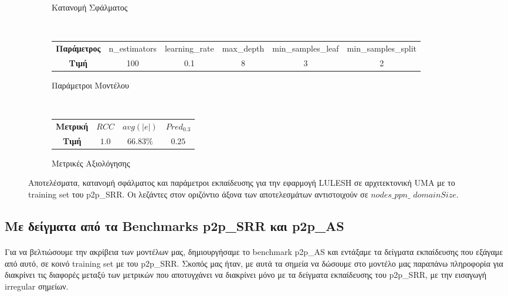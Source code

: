 \begin{figure}[H]
\begin{subfigure}[b]{0.47\textwidth}
        \caption{Κατανομή Σφάλματος}
        \label{fig:NB_lulesh_UMA_err}
    \end{subfigure}  
    \\[0.2cm]
    \begin{subfigure}[b]{\textwidth}
   	 	\scriptsize
		\begin{tabular}{c||c|c|c|c|c}
			\textbf{Παράμετρος} & n\_estimators & learning\_rate & max\_depth & min\_samples\_leaf & min\_samples\_split \\
			\textbf{Τιμή}       &       100        &  0.1               &  8          &  3                  &    2                 
		\end{tabular}
		\caption{Παράμετροι Μοντέλου}
    \end{subfigure}
    \\[0.2cm]
    \begin{subfigure}[b]{\textwidth}
    		\centering
   	 	\scriptsize
		\begin{tabular}{c||c|c|c}
					\textbf{Μετρική} & $RCC$ &   $avg(|e|)$ & $Pred_{0.3}$  \\
			\textbf{Τιμή}  &  $1.0$   &      $66.83\%
			$        &  $0.25$                                         
		\end{tabular}
		\caption{Μετρικές Αξιολόγησης}
    \end{subfigure}
    \caption{Αποτελέσματα, κατανομή σφάλματος και παράμετροι εκπαίδευσης για την εφαρμογή LULESH σε αρχιτεκτονική UMA με το training set του p2p\_SRR. Οι λεζάντες στον οριζόντιο άξονα των αποτελεσμάτων αντιστοιχούν σε $nodes\_ppn\_$ $domainSize$.}
    \label{fig:NB_lulesh_UMA}
\end{figure}	


\subsection{Με δείγματα από τα Benchmarks p2p\_SRR και p2p\_AS}
\paragraph{}
Για να βελτιώσουμε την ακρίβεια των μοντέλων μας, δημιουργήσαμε το benchmark p2p\_AS και εντάξαμε τα δείγματα εκπαίδευσης που εξάγαμε από αυτό, σε κοινό training set με του p2p\_SRR. Σκοπός μας ήταν, με αυτά τα σημεία να δώσουμε στο μοντέλο μας παραπάνω πληροφορία για διακρίνει τις διαφορές μεταξύ των μετρικών που αποτυγχάνει να διακρίνει μόνο με τα δείγματα εκπαίδευσης του p2p\_SRR, με την εισαγωγή irregular σημείων.

